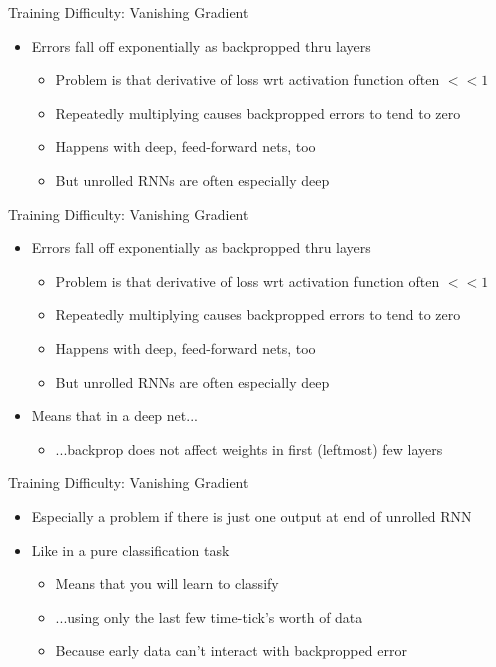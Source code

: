 \documentclass[aspectratio=169]{beamer}
\begin{document}
\begin{frame}{Training Difficulty: Vanishing Gradient}

\begin{itemize}
	\item Errors fall off exponentially as backpropped thru layers	
	\begin{itemize}
		\item Problem is that derivative of loss wrt activation function often $<< 1$
		\item Repeatedly multiplying causes backpropped errors to tend to zero
		\item Happens with deep, feed-forward nets, too 
		\item But unrolled RNNs are often especially deep
	\end{itemize}
\end{itemize}

\end{frame}
\begin{frame}{Training Difficulty: Vanishing Gradient}

\begin{itemize}
	\item Errors fall off exponentially as backpropped thru layers	
	\begin{itemize}
		\item Problem is that derivative of loss wrt activation function often $<< 1$
		\item Repeatedly multiplying causes backpropped errors to tend to zero
		\item Happens with deep, feed-forward nets, too 
		\item But unrolled RNNs are often especially deep
	\end{itemize}
	\item Means that in a deep net...
	\begin{itemize}
	\item ...backprop does not affect weights in first (leftmost) few layers
	\end{itemize}
\end{itemize}

\end{frame}
\begin{frame}{Training Difficulty: Vanishing Gradient}

\begin{itemize}
	\item Especially a problem if there is just one output at end of unrolled RNN
	\item Like in a pure classification task
	\begin{itemize}
	\item Means that you will learn to classify
	\item ...using only the last few time-tick's worth of data
	\item Because early data can't interact with backpropped error
	\end{itemize}
\end{itemize}

\end{frame}
\end{document}
